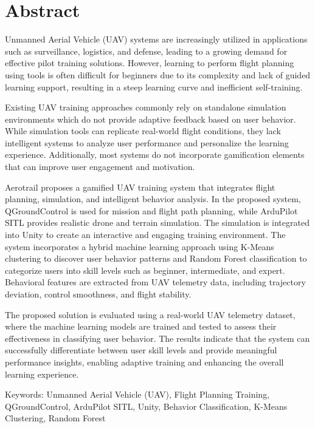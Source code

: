 \chapter*{Abstract}
\label{chap:abstract}

Unmanned Aerial Vehicle (UAV) systems are increasingly utilized in applications such as surveillance, logistics, and defense, leading to a growing demand for effective pilot training solutions. However, learning to perform flight planning using tools is often difficult for beginners due to its complexity and lack of guided learning support, resulting in a steep learning curve and inefficient self-training.

Existing UAV training approaches commonly rely on standalone simulation environments which do not provide adaptive feedback based on user behavior. While simulation tools can replicate real-world flight conditions, they lack intelligent systems to analyze user performance and personalize the learning experience. Additionally, most systems do not incorporate gamification elements that can improve user engagement and motivation.

Aerotrail proposes a gamified UAV training system that integrates flight planning, simulation, and intelligent behavior analysis. In the proposed system, QGroundControl is used for mission and flight path planning, while ArduPilot SITL provides realistic drone and terrain simulation. The simulation is integrated into Unity to create an interactive and engaging training environment. The system incorporates a hybrid machine learning approach using K-Means clustering to discover user behavior patterns and Random Forest classification to categorize users into skill levels such as beginner, intermediate, and expert. Behavioral features are extracted from UAV telemetry data, including trajectory deviation, control smoothness, and flight stability.

The proposed solution is evaluated using a real-world UAV telemetry dataset, where the machine learning models are trained and tested to assess their effectiveness in classifying user behavior. The results indicate that the system can successfully differentiate between user skill levels and provide meaningful performance insights, enabling adaptive training and enhancing the overall learning experience.

Keywords: Unmanned Aerial Vehicle (UAV), Flight Planning Training, QGroundControl, ArduPilot SITL, Unity, Behavior Classification, K-Means Clustering, Random Forest